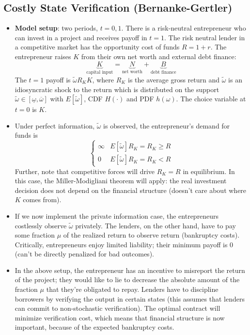 \documentclass[12pt]{article}
\begin{document}
\subsection{Costly State Verification (Bernanke-Gertler)}

\begin{itemize}
    \item \textbf{Model setup}: two periods, $t=0,1$. There is a risk-neutral entrepreneur who can invest in a project and receives payoff in $t=1$. The risk neutral lender in a competitive market has the opportunity cost of funds $R=1+r$. The entrepreneur raises $K$ from their own net worth and external debt finance:
    \[\underbrace{K}_{\text{capital input}} = \underbrace{N}_{\text{net worth}} + \underbrace{B}_{\text{debt finance}}\]
    The $t=1$ payoff is $\widetilde{\omega}R_KK$, where $R_K$ is the average gross return and $\widetilde{\omega}$ is an idiosyncratic shock to the return which is distributed on the support $\widetilde{\omega} \in [\underline{\omega}, \overline{\omega}]$ with $E[\widetilde{\omega}]$, CDF $H(\cdot)$ and PDF $h(\omega)$. The choice variable at $t=0$ is $K$. 
    \item Under perfect information, $\widetilde{\omega}$ is observed, the entrepreneur's demand for funds is
    \[\begin{cases}
    \infty & E[\widetilde{\omega}]R_K = R_K \geq R \\
    0 & E[\widetilde{\omega}]R_K = R_K < R
    \end{cases}\]
    Further, note that competitive forces will drive $R_K = R$ in equilibrium. In this case, the Miller-Modigliani theorem will apply: the real investment decision does not depend on the financial structure (doesn't care about where $K$ comes from). 
    \item If we now implement the private information case, the entrepreneurs costlessly observe $\widetilde{\omega}$ privately. The lenders, on the other hand, have to pay some fraction $\mu$ of the realized return to observe return (bankruptcy costs). Critically, entrepreneurs enjoy limited liability; their minimum payoff is 0 (can't be directly penalized for bad outcomes).
    \item In the above setup, the entrepreneur has an incentive to misreport the return of the project; they would like to lie to decrease the absolute amount of the fraction $\mu$ that they're obligated to repay. Lenders have to discipline borrowers by verifying the output in certain states (this assumes that lenders can commit to non-stochastic verification). The optimal contract will minimize verification cost, which means that financial structure is now important, because of the expected bankruptcy costs. 

\end{itemize}
\end{document}
